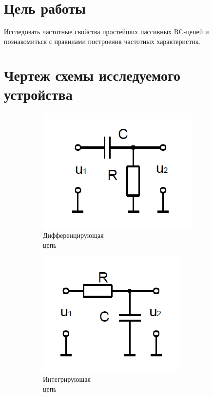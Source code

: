 





\section{Цель работы}
Исследовать частотные свойства простейших пассивных RC­-цепей и познакомиться с правилами построения частотных характеристик.


\section{Чертеж схемы исследуемого устройства}
\begin{figure}[h]
\centering
\begin{subfigure}[b]{0.34\textwidth}
\includegraphics[scale=0.4]{img/a_scheme.png}
\caption{Дифференцирующая\\ цепь}\label{figure:2.1:a}
\end{subfigure}
\begin{subfigure}[b]{0.3\textwidth}
\includegraphics[scale=0.4]{img/b_scheme.png}
\caption{Интегрирующая\\ цепь}\label{figure:2.1:b}
\end{subfigure}
\begin{subfigure}[b]{0.3\textwidth}

\end{subfigure}
\end{figure}

